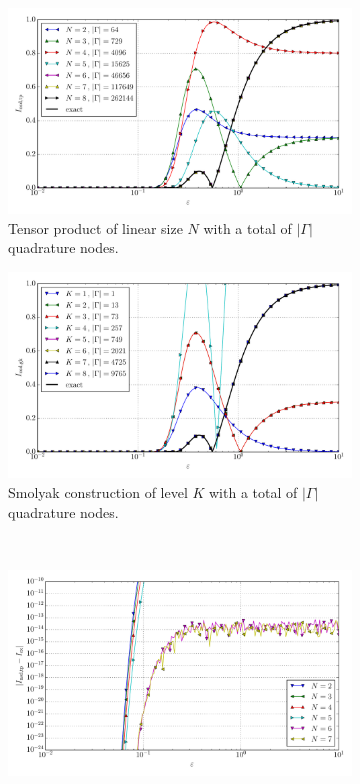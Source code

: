 \documentclass[a4paper,10pt]{article}
\begin{document}
\begin{figure}[ht!]
  \begin{subfigure}[t]{0.5\linewidth}
    \includegraphics[width=\linewidth]{./plots/tp_sg_6d_conv_eps_(5,0,0,0,0,0)_(5,0,0,0,0,0)_val_nsd_tp.pdf}
    \caption{Tensor product of linear size $N$ with a total of $|\Gamma|$ quadrature nodes.}
    \label{fig:tp_sg_6d_conv_eps_500000_500000_val_nsd_tp}
  \end{subfigure}
  \begin{subfigure}[t]{0.5\linewidth}
    \includegraphics[width=\linewidth]{./plots/tp_sg_6d_conv_eps_(5,0,0,0,0,0)_(5,0,0,0,0,0)_val_nsd_gk.pdf}
    \caption{Smolyak construction of level $K$ with a total of $|\Gamma|$ quadrature nodes.}
    \label{fig:tp_sg_6d_conv_eps_500000_500000_val_nsd_gk}
  \end{subfigure} \\
  \begin{subfigure}[t]{0.5\linewidth}
    \includegraphics[width=\linewidth]{./plots/tp_sg_6d_conv_eps_(5,0,0,0,0,0)_(5,0,0,0,0,0)_err_nsd_tp.pdf}

\end{subfigure}
\end{figure}
\end{document}
